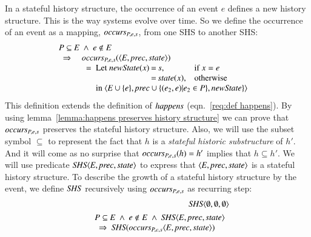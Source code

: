 \documentclass{elsarticle}
\def\id#1{\text{\it #1\/}}
\def\Events{{\mathit E}}
\begin{document}
	In a stateful history structure, the occurrence of an event $e$ defines a new history structure.
	This is the way systems evolve over time.
	So we define the occurrence of an event as a mapping, $\id{occurs}_{P,e,s}$, from one SHS to another SHS:
\begin{equation}
\begin{array}{l}
	P\subseteq\Events\ \wedge\ e\notin E\\
	\ \ \Rightarrow\ \ 
\begin{array}[t]{l}
	\id{occurs}_{P,e,s}(\la\Events, \id{prec}, \id{state}\ra)\\
	\ \ =\ \begin{array}[t]{@{}l@{\hspace{.2em}}c@{\hspace{.2em}}ll}
		\text{Let }\id{newState}(x)&=&s\text{,}&\text{if }x=e\\
				&=&\id{state}(x)\text{,}&\text{otherwise}\\
		\multicolumn{4}{@{}l}{\text{in }\la\Events\cup\{e\}, \id{prec}\cup\{(e_2,e)|e_2\in P\}, \id{newState}\}\ra}
		\end{array}
\end{array}
\end{array}
\label{req:def occurs}
\end{equation}
	This definition extends the definition of $\id{happens}$ (eqn.~\ref{req:def happens}).
	By using lemma~\ref{lemma:happens preserves history structure} we can prove that $\id{occurs}_{P,e,s}$ preserves
	the stateful history structure.
	Also, we will use the subset symbol $\subseteq$ to represent the fact that $h$ is a {\em stateful historic substructure} of $h'$.
	And it will come as no surprise that $\id{occurs}_{P,e,s}(h)=h'$ implies that $h\subseteq h'$.
	We will use predicate $\id{SHS}\la \Events, \id{prec}, \id{state}\ra$
	to express that $\la \Events, \id{prec}, \id{state}\ra$ is a stateful history structure.
	To describe the growth of a stateful history structure by the event,
	we define $\id{SHS}$ recursively using $\id{occurs}_{P,e,s}$ as recurring step:
\begin{eqnarray}
	&&\id{SHS}\la \emptyset, \emptyset, \emptyset\ra\\
&&\begin{array}{@{}l}
	P\subseteq\Events\ \wedge\ e\notin E\ \wedge\ \id{SHS}\la \Events, \id{prec}, \id{state}\ra\\
	\ \ \Rightarrow\ \id{SHS}(\id{occurs}_{P,e,s}\la \Events, \id{prec}, \id{state}\ra)
\end{array}
\label{req:recursive def occurs}
\end{eqnarray}
\end{document}
